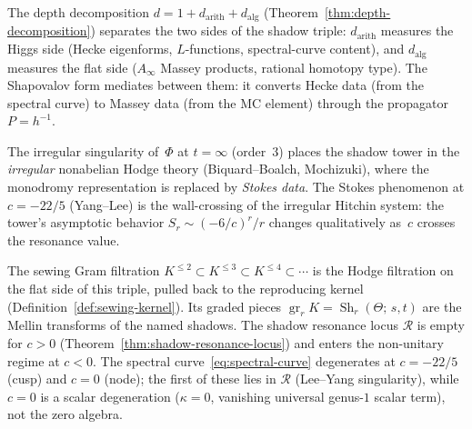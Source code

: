 \begin{remark}
\label{rem:depth-hodge}
The depth decomposition
$d = 1 + d_{\mathrm{arith}} + d_{\mathrm{alg}}$
(Theorem~\ref{thm:depth-decomposition}) separates the two sides
of the shadow triple:
$d_{\mathrm{arith}}$ measures the Higgs side
(Hecke eigenforms, $L$-functions, spectral-curve content),
and $d_{\mathrm{alg}}$ measures the flat side
($A_\infty$ Massey products, rational homotopy type).
The Shapovalov form mediates between them: it converts Hecke data
(from the spectral curve) to Massey data (from the MC element)
through the propagator~$P = h^{-1}$.

The irregular singularity of~$\Phi$ at $t = \infty$
\textup{(}order~$3$\textup{)} places the shadow tower in the
\emph{irregular} nonabelian Hodge theory
\textup{(}Biquard--Boalch, Mochizuki\textup{)}, where the
monodromy representation is replaced by \emph{Stokes data}.
The Stokes phenomenon at $c = -22/5$ \textup{(}Yang--Lee\textup{)}
is the wall-crossing of the irregular Hitchin system: the tower's asymptotic behavior $S_r \sim (-6/c)^r/r$ changes
qualitatively as~$c$ crosses the resonance value.

The sewing Gram filtration\label{rem:gram-shadow-filtration}
$K^{\leq 2} \subset K^{\leq 3} \subset K^{\leq 4} \subset \cdots$
is the
Hodge filtration on the flat side of this triple,
pulled back to the reproducing kernel
(Definition~\ref{def:sewing-kernel}). Its graded pieces
$\operatorname{gr}_r K = \operatorname{Sh}_r(\Theta;\,s,t)$
are the Mellin transforms of the named shadows.
The shadow resonance locus
$\mathcal{R}$ is empty for $c > 0$
(Theorem~\ref{thm:shadow-resonance-locus})
and enters the non-unitary regime at $c < 0$.
The spectral curve~\eqref{eq:spectral-curve} degenerates at
$c = -22/5$ (cusp) and $c = 0$ (node); the first of these
lies in $\mathcal{R}$ (Lee--Yang singularity), while
$c = 0$ is a scalar degeneration
($\kappa = 0$, vanishing universal genus-$1$ scalar term), not the
zero algebra.
\end{remark}

